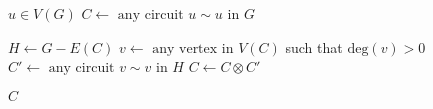 
\begin{algorithm}[H]
  \begin{algorithmic}[1]
      \State $u \in V(G)$
      \State $C \gets \text{ any circuit } u \sim u$ in $G$

      \hStatex
	\State $H \gets G - E(C)$
	\State $v \gets \text{ any vertex in } V(C)$ such that $\text{deg}(v) > 0$
	\State $C' \gets \text{ any circuit } v \sim v$ in $H$
	\State $C \gets C \otimes C'$ 
      \EndWhile

      \hStatex
      \State \Return $C$
    \EndProcedure
  \end{algorithmic}
\end{algorithm}
